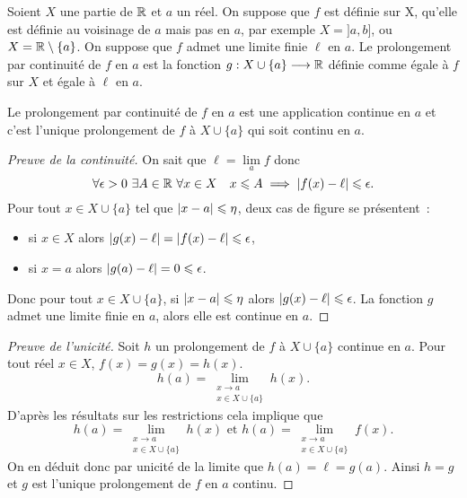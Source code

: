Soient \(X\) une partie de \(\mathbb{R}\) et \(a\) un réel. On suppose que \(f\) est 
définie sur X, qu'elle est définie au voisinage de \(a\) mais pas en \(a\), par 
exemple \(X=]a,b]\), ou \(X=\mathbb{R}\setminus\{a\}\). On suppose que \(f\) admet une 
limite finie \(\ell\) en \(a\). Le prolongement par continuité de \(f\) en \(a\) 
est la fonction \(g:X\cup\{a\} \longrightarrow \mathbb{R}\) définie comme égale à \(f\) 
sur \(X\) et égale à \(\ell\) en \(a\).

\begin{prop}
  Le prolongement par continuité de \(f\) en \(a\) est une application continue 
  en \(a\) et c'est l'unique prolongement de \(f\) à \(X \cup \{a\}\) qui soit 
  continu en \(a\).
\end{prop}
\begin{proof}[Preuve de la continuité]
  On sait que \(\ell=\lim\limits_{a}f\) donc
  \begin{equation}
    \forall \epsilon >0 \ \exists A \in \mathbb{R} \ \forall x \in X \quad x \leqslant A 
    \implies \left\lvert f(x)-\ell\right\rvert \leqslant \epsilon.
  \end{equation}
  Pour tout \(x \in X \cup \{a\}\) tel que \(\left\lvert x-a\right\rvert \leqslant \eta\), deux 
  cas de figure se présentent~:
  \begin{itemize}
    \item si \(x \in X\) alors \(\left\lvert g(x)-\ell\right\rvert=\left\lvert f(x)-\ell\right\rvert \leqslant 
      \epsilon\),
    \item si \(x=a\) alors \(\left\lvert g(a)-\ell\right\rvert=0 \leqslant \epsilon\).
  \end{itemize}
  Donc pour tout \(x \in X \cup \{a\}\), si \(\left\lvert x-a\right\rvert \leqslant \eta\) alors 
  \(\left\lvert g(x)-\ell\right\rvert \leqslant \epsilon\). La fonction \(g\) admet une limite 
  finie en \(a\), alors elle est continue en \(a\).
\end{proof}
\begin{proof}[Preuve de l'unicité]
  Soit \(h\) un prolongement de \(f\) à \(X \cup \{a\}\) continue en \(a\). Pour 
  tout réel \(x \in X\), \(f(x)=g(x)=h(x)\).
  \begin{equation}
    h(a)= \lim\limits_{\begin{array}{c} x \to a \\ x \in 
    X\cup\{a\}\end{array}}h(x).
  \end{equation}
  D'après les résultats sur les restrictions cela implique que
  \begin{equation}
    h(a)= \lim\limits_{\begin{array}{c} x \to a \\ x \in 
      X\cup\{a\}\end{array}}h(x) \text{~et~} h(a)= \lim\limits_{\begin{array}{c} 
    x \to a \\ x \in X\cup\{a\}\end{array}}f(x).
  \end{equation}
  On en déduit donc par unicité de la limite que \(h(a)=\ell=g(a)\). Ainsi 
  \(h=g\) et \(g\) est l'unique prolongement de \(f\) en \(a\) continu.
\end{proof}

